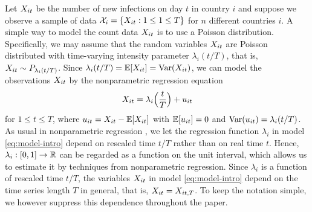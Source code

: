 \documentclass[a4paper,12pt]{article}
\numberwithin{equation}{section}
\begin{document}
Let $X_{it}$ be the number of new infections on day $t$ in country $i$ and suppose we observe a sample of data $\mathcal{X}_i = \{ X_{it}: 1 \le 1 \le T \}$ for $n$ different countries $i$. A simple way to model the count data $X_{it}$ is to use a Poisson distribution. Specifically, we may assume that the random variables $X_{it}$ are Poisson distributed with time-varying intensity parameter $\lambda_i(t/T)$, that is, $X_{it} \sim P_{\lambda_i(t/T)}$. Since $\lambda_i(t/T) = \mathbb{E}[X_{it}] = \textnormal{Var}(X_{it})$, we can model the observations $X_{it}$ by the nonparametric regression equation 
\begin{equation}\label{eq:model-intro}
X_{it} = \lambda_i\Big(\frac{t}{T}\Big) + u_{it} 
\end{equation}
for $1 \le t \le T$, where $u_{it} = X_{it} - \mathbb{E}[X_{it}]$ with $\mathbb{E}[u_{it}] = 0$ and $\textnormal{Var}(u_{it}) = \lambda_i(t/T)$. As usual in nonparametric regression \citep[cp.][]{Robinson1989}, we let the regression function $\lambda_i$ in model \eqref{eq:model-intro} depend on rescaled time $t/T$ rather than on real time $t$.
Hence, $\lambda_i: [0,1] \rightarrow \mathbb{R}$ can be regarded as a function on the unit interval, which allows us to estimate it by techniques from nonparametric regression. 
Since $\lambda_i$ is a function of rescaled time $t/T$, the variables $X_{it}$ in model \eqref{eq:model-intro} depend on the time series length $T$ in general, that is, $X_{it} = X_{it,T}$. To keep the notation simple, we however suppress this dependence throughout the paper. 
\end{document}
